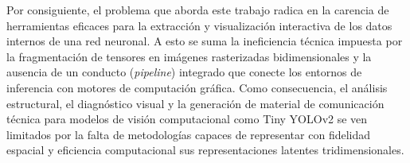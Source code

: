 Por consiguiente, el problema que aborda este trabajo radica en la carencia de herramientas eficaces para la extracción y 
visualización interactiva de los datos internos de una red neuronal. A esto se suma la ineficiencia técnica impuesta por 
la fragmentación de tensores en imágenes rasterizadas bidimensionales y la ausencia de un conducto (\textit{pipeline}) 
integrado que conecte los entornos de inferencia con motores de computación gráfica. Como consecuencia, el análisis estructural, 
el diagnóstico visual y la generación de material de comunicación técnica para modelos de visión computacional como Tiny YOLOv2 
se ven limitados por la falta de metodologías capaces de representar con fidelidad espacial y eficiencia computacional sus 
representaciones latentes tridimensionales.